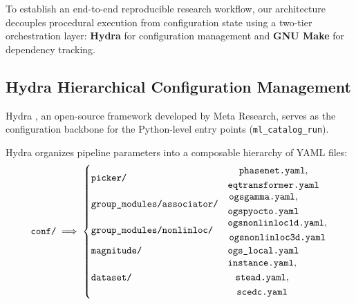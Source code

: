 To establish an end-to-end reproducible research workflow, our
architecture decouples procedural execution from configuration state
using a two-tier orchestration layer: \textbf{Hydra} for
configuration management and \textbf{GNU Make} for dependency tracking.

\subsection{Hydra Hierarchical Configuration Management}
Hydra \parencite{Hydra}, an open-source framework developed by Meta
Research, serves as the configuration backbone for the Python-level
entry points (\texttt{ml\_catalog\_run}).

Hydra organizes pipeline parameters into a composable hierarchy of YAML files:
\begin{equation}
  \text{\texttt{conf/}} \implies
  \begin{cases}
    \text{\texttt{picker/}} &
    \begin{gathered}
      \text{\texttt{phasenet.yaml}}, \\
      \text{\texttt{eqtransformer.yaml}}
    \end{gathered} \\
    \text{\texttt{group\_modules/associator/}} &
    \begin{gathered}
      \text{\texttt{ogsgamma.yaml}}, \\
      \text{\texttt{ogspyocto.yaml}}
    \end{gathered} \\
    \text{\texttt{group\_modules/nonlinloc/}} &
    \begin{gathered}
      \text{\texttt{ogsnonlinloc1d.yaml}}, \\
      \text{\texttt{ogsnonlinloc3d.yaml}}
    \end{gathered} \\
    \text{\texttt{magnitude/}} & \text{\texttt{ogs\_local.yaml}} \\
    \text{\texttt{dataset/}} &
    \begin{gathered}
      \text{\texttt{instance.yaml}}, \\
      \text{\texttt{stead.yaml}}, \\
      \text{\texttt{scedc.yaml}}
    \end{gathered}
  \end{cases}
\end{equation}

